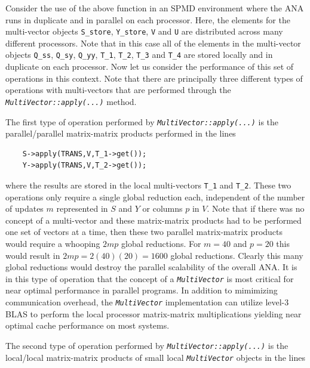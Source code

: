 Consider the use of the above function in an SPMD environment where
the ANA runs in duplicate and in parallel on each processor.  Here,
the elements for the multi-vector objects \texttt{S\_store},
\texttt{Y\_store}, \texttt{V} and \texttt{U} are distributed across
many different processors.  Note that in this case all of the elements
in the multi-vector objects \texttt{Q\_ss}, \texttt{Q\_sy}, \texttt{Q\_yy},
\texttt{T\_1}, \texttt{T\_2}, \texttt{T\_3} and \texttt{T\_4} are stored
locally and in duplicate on each processor.  Now let us consider the
performance of this set of operations in this context.  Note that
there are principally three different types of operations with
multi-vectors that are performed through the
\texttt{\textit{Multi\-Vector\-::apply(\-...)}} method.

The first type of operation performed by
\texttt{\textit{Multi\-Vector\-::apply(\-...)}} is the parallel/parallel
matrix-matrix products performed in the lines

{\tiny\begin{verbatim}
    S->apply(TRANS,V,T_1->get());
    Y->apply(TRANS,V,T_2->get());
\end{verbatim}}

where the results are stored in the local multi-vectors 
\texttt{T\_1} and \texttt{T\_2}.  These two operations only
require a single global reduction each, independent of the number of
updates $m$ represented in $S$ and $Y$ or columns $p$ in $V$.  Note
that if there was no concept of a multi-vector and these matrix-matrix
products had to be performed one set of vectors at a time, then these
two parallel matrix-matrix products would require a whooping $2 m p$
global reductions.  For $m = 40$ and $p = 20$ this would result in $2
m p = 2(40)(20) = 1600$ global reductions.  Clearly this many global
reductions would destroy the parallel scalability of the overall ANA.
It is in this type of operation that the concept of a
\texttt{\textit{Multi\-Vector}} is most critical for near optimal
performance in parallel programs.  In addition to mimimizing
communication overhead, the \texttt{\textit{Multi\-Vector}}
implementation can utilize level-3 BLAS to perform the local processor
matrix-matrix multiplications yielding near optimal cache performance
on most systems.

The second type of operation performed by
\texttt{\textit{Multi\-Vector\-::apply(\-...)}} is the local/local matrix-matrix
products of small local \texttt{\textit{Multi\-Vector}} objects in the
lines

